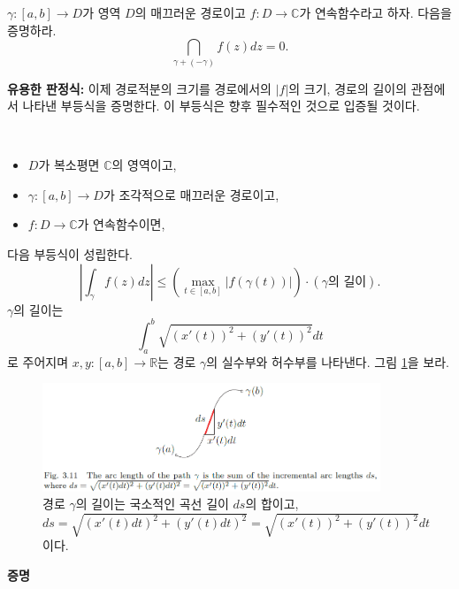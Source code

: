 \begin{salt_exercise} \label{ex-3-8}
$\gamma: [a,b] \to D$가 영역 $D$의 매끄러운 경로이고
$f:D\to\mathbb C$가 연속함수라고 하자. 다음을 증명하라.
\[
\dint_{\gamma+(-\gamma)} f(z)dz =0.
\]
\end{salt_exercise}

{\bf 유용한 판정식:}
이제 경로적분의 크기를 경로에서의 $|f|$의 크기, 경로의 길이의 관점에서
나타낸 부등식을 증명한다. 이 부등식은 향후 필수적인 것으로 입증될 것이다.

\begin{salt_prop} \label{prop-3-4}
\
\begin{itemize}
\item[(1)] $D$가 복소평면 $\mathbb C$의 영역이고,
\item[(2)]  $\gamma : [a,b] \to D$가 조각적으로 매끄러운 경로이고,
\item[(3)] $f:D\to\mathbb C$가 연속함수이면,
\end{itemize}
다음 부등식이 성립한다.
\begin{equation} \label{eq-3-3}
\left| \int_\gamma f(z)dz \right| 
\le \left( \max_{t\in[a,b]} |f(\gamma(t))| \right) 
\cdot (\gamma \text{의 길이}).
\end{equation}
$\gamma$의 길이는 
\[
\int_a^b \sqrt{ (x'(t))^2 + (y'(t))^2} dt
\]
로 주어지며 $x,y: [a,b] \to \mathbb R$는
경로 $\gamma$의 실수부와 허수부를 나타낸다.
그림 \ref{fig-3-11}을 보라.
\begin{figure}[!h]
\begin{center}
\includegraphics[width=0.9\textwidth]{./SaltChapter/fig-3-11}
\end{center}
\caption{경로 $\gamma$의 길이는 국소적인 곡선 길이 $ds$의 합이고,
$ds = \sqrt{(x'(t)dt)^2 + (y'(t)dt)^2} = \sqrt{(x'(t))^2 + (y'(t))^2}dt$이다.}
\label{fig-3-11}
\end{figure}
\end{salt_prop}

{\bf 증명}

